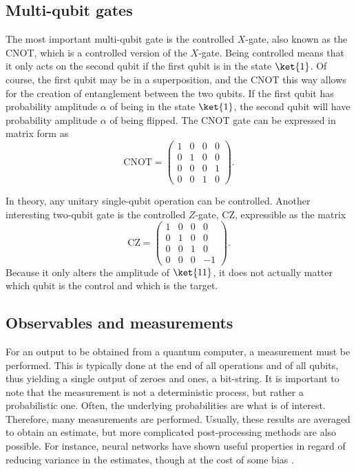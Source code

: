 \subsection{Multi-qubit gates}
The most important multi-qubit gate is the controlled $X$-gate, also known as the CNOT, which is a controlled version of the $X$-gate.
Being controlled means that it only acts on the second qubit if the first qubit is in the state $\ket{1}$.
Of course, the first qubit may be in a superposition, and the CNOT this way allows for the creation of entanglement between the two qubits.
If the first qubit has probability amplitude $\alpha$ of being in the state $\ket{1}$, the second qubit will have probability amplitude $\alpha$ of being flipped.
The CNOT gate can be expressed in matrix form as
\begin{equation}
    \text{CNOT} = \begin{pmatrix} 1 & 0 & 0 & 0 \\ 0 & 1 & 0 & 0 \\ 0 & 0 & 0 & 1 \\ 0 & 0 & 1 & 0 \end{pmatrix}.
\end{equation}

In theory, any unitary single-qubit operation can be controlled.
Another interesting two-qubit gate is the controlled $Z$-gate, CZ, expressible as the matrix
\begin{equation}
    \text{CZ} = \begin{pmatrix} 1 & 0 & 0 & 0 \\ 0 & 1 & 0 & 0 \\ 0 & 0 & 1 & 0 \\ 0 & 0 & 0 & -1 \end{pmatrix}.
\end{equation}
Because it only alters the amplitude of $\ket{11}$, it does not actually matter which qubit is the control and which is the target.



\subsection{Observables and measurements}
For an output to be obtained from a quantum computer, a measurement must be performed.
This is typically done at the end of all operations and of all qubits, thus yielding a single output of zeroes and ones, a bit-string.
It is important to note that the measurement is not a deterministic process, but rather a probabilistic one.
Often, the underlying probabilities are what is of interest.
Therefore, many measurements are performed.
Usually, these results are averaged to obtain an estimate, but more complicated post-processing methods are also possible.
For instance, neural networks have shown useful properties in regard of reducing variance in the estimates, though at the cost of some bias \cite{torlai2020}.

